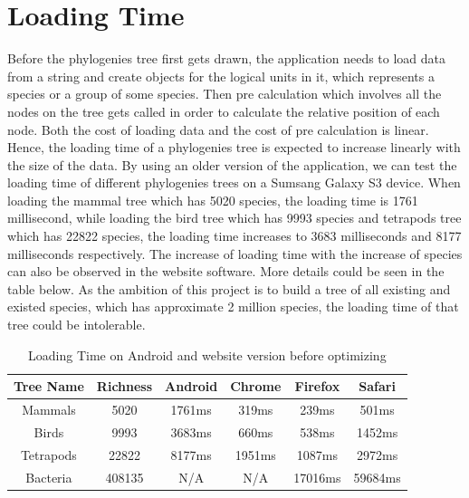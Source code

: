 \documentclass[MSc]{icldt}
\begin{document}
\section{Loading Time}

Before the phylogenies tree first gets drawn, the application needs to load data from a string and create objects for the logical units in it, which represents a species or a group of some species. Then pre calculation which involves all the nodes on the tree gets called in order to calculate the relative position of each node. Both the cost of loading data and the cost of pre calculation is linear. Hence, the loading time of a phylogenies tree is expected to increase linearly with the size of the data. By using an older version of the application, we can test the loading time of different phylogenies trees on a Sumsang Galaxy S3 device. When loading the mammal tree which has 5020 species, the loading time is 1761 millisecond, while loading the bird tree which has 9993 species and tetrapods tree which has 22822 species, the loading time increases to 3683 milliseconds and 8177 milliseconds respectively. The increase of loading time with the increase of species can also be observed in the website software. More details could be seen in the table below. As the ambition of this project is to build a tree of all existing and existed species, which has approximate 2 million species, the loading time of that tree could be intolerable.

\begin{table} [H]
	\centering %
	\begin{tabular}{|c c c c c c|} %
		\hline %
		Tree Name & Richness  & Android & Chrome & Firefox & Safari\\%
		\hline  %
		Mammals & 5020 & 1761ms & 319ms & 239ms & 501ms \\  %
		\hline
		Birds & 9993 & 3683ms & 660ms & 538ms & 1452ms \\
		\hline
		Tetrapods & 22822 & 8177ms & 1951ms & 1087ms & 2972ms\\ 
		\hline %
		Bacteria & 408135 & N/A & N/A & 17016ms  & 59684ms\\ [1ex] %
		\hline
	\end{tabular}
	\label{table:nonlin} %
	\caption{Loading Time on Android and website version before optimizing} %
\end{table}
\end{document}
